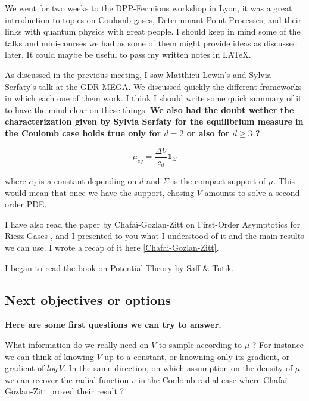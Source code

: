 \documentclass[a4paper,12pt]{report}
\begin{document}
We went for two weeks to the DPP-Fermions workshop in Lyon, it was a great introduction to topics on Coulomb gases, Determinant Point Processes, and their links with quantum physics with great people. I should keep in mind some of the talks and mini-courses we had as some of them might provide ideas as discussed later. It could maybe be useful to pass my written notes in LATeX.
\vspace{0.5cm}

As discussed in the previous meeting, I saw Matthieu Lewin's and Sylvia Serfaty's talk at the GDR MEGA. We discussed quickly the different frameworks in which each one of them work. I think I should write some quick summary of it to have the mind clear on these things. \textbf{We also had the doubt wether the characterization given by Sylvia Serfaty for the equilibrium measure in the Coulomb case holds true only for $d = 2$ or also for $d \geq 3$ ?} :

\[ \mu_{eq} = \frac{\Delta V}{c_d} \mathds{1}_{\Sigma}\]

where $c_d$ is a constant depending on $d$ and $\Sigma$ is the compact support of $\mu$. This would mean that once we have the support, chosing $V$ amounts to solve a second order PDE.
\vspace{0.5cm}

I have also read the paper by Chafaï-Gozlan-Zitt on First-Order Asymptotics for Riesz Gases \cite{chafai-gozlan-zitt}, and I presented to you what I understood of it and the main results we can use. I wrote a recap of it here \ref{Chafai-Gozlan-Zitt}.
\vspace{0.5cm}

I began to read the book on Potential Theory by Saff \& Totik.


\subsection*{Next objectives or options}

\textbf{Here are some first questions we can try to answer.} 
\vspace{0.5cm}

What information do we really need on $V$ to sample according to $\mu$ ? For instance we can think of knowing $V$ up to a constant, or knowning only its gradient, or gradient of $log\, V$. In the same direction, on which assumption on the density of $\mu$ we can recover the radial function $v$ in the Coulomb radial case where Chafaï-Gozlan-Zitt proved their result ?
\vspace{0.5cm}
\end{document}
